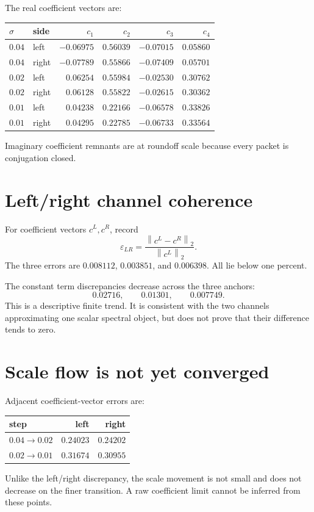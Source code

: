 \documentclass[12pt]{article}
\theoremstyle{remark}\newtheorem{remark}[theorem]{Remark}
\newcommand{\norm}[1]{\left\lVert#1\right\rVert}
\begin{document}
The real coefficient vectors are:
\begin{center}
\small
\begin{tabular}{llrrrr}
\toprule
$\sigma$ & side & $c_1$ & $c_2$ & $c_3$ & $c_4$\\
\midrule
$0.04$ & left  & $-0.06975$ & $0.56039$ & $-0.07015$ & $0.05860$\\
$0.04$ & right & $-0.07789$ & $0.55866$ & $-0.07409$ & $0.05701$\\
$0.02$ & left  & $ 0.06254$ & $0.55984$ & $-0.02530$ & $0.30762$\\
$0.02$ & right & $ 0.06128$ & $0.55822$ & $-0.02615$ & $0.30362$\\
$0.01$ & left  & $ 0.04238$ & $0.22166$ & $-0.06578$ & $0.33826$\\
$0.01$ & right & $ 0.04295$ & $0.22785$ & $-0.06733$ & $0.33564$\\
\bottomrule
\end{tabular}
\end{center}
Imaginary coefficient remnants are at roundoff scale because every packet
is conjugation closed.

\section{Left/right channel coherence}

For coefficient vectors $c^L,c^R$, record
\begin{equation}\label{eq:error}
 \varepsilon_{LR}=\frac{\norm{c^L-c^R}_2}{\norm{c^L}_2}.
\end{equation}
The three errors are $0.008112$, $0.003851$, and $0.006398$.  All lie below
one percent.

The constant term discrepancies decrease across the three anchors:
\begin{equation}\label{eq:constant-flow}
 0.02716,\qquad0.01301,\qquad0.007749.
\end{equation}
This is a descriptive finite trend.  It is consistent with the two channels
approximating one scalar spectral object, but does not prove that their
difference tends to zero.

\section{Scale flow is not yet converged}

Adjacent coefficient-vector errors are:
\begin{center}
\begin{tabular}{lrr}
\toprule
step & left & right\\
\midrule
$0.04\to0.02$ & $0.24023$ & $0.24202$\\
$0.02\to0.01$ & $0.31674$ & $0.30955$\\
\bottomrule
\end{tabular}
\end{center}
Unlike the left/right discrepancy, the scale movement is not small and does
not decrease on the finer transition.  A raw coefficient limit cannot be
inferred from these points.
\end{document}
